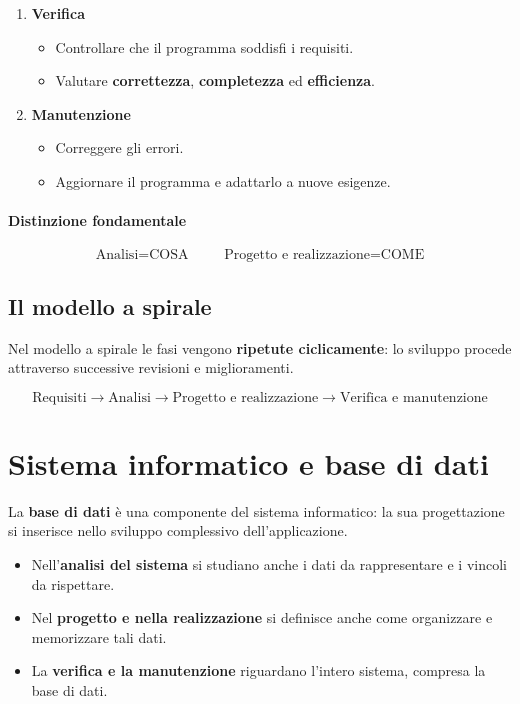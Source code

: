 \begin{enumerate}
    \item \textbf{Verifica}
    \begin{itemize}
        \item Controllare che il programma soddisfi i requisiti.
        \item Valutare \textbf{correttezza}, \textbf{completezza}
        ed \textbf{efficienza}.
    \end{itemize}

    \item \textbf{Manutenzione}
    \begin{itemize}
        \item Correggere gli errori.
        \item Aggiornare il programma e adattarlo a nuove esigenze.
    \end{itemize}
\end{enumerate}

\paragraph{Distinzione fondamentale}
\[
\boxed{\text{Analisi} = \text{COSA}}
\qquad
\boxed{\text{Progetto e realizzazione} = \text{COME}}
\]

\subsection{Il modello a spirale}

Nel modello a spirale le fasi vengono \textbf{ripetute ciclicamente}:
lo sviluppo procede attraverso successive revisioni e miglioramenti.

\[
\text{Requisiti}
\longrightarrow
\text{Analisi}
\longrightarrow
\text{Progetto e realizzazione}
\longrightarrow
\text{Verifica e manutenzione}
\]

\section{Sistema informatico e base di dati}

La \textbf{base di dati} è una componente del sistema informatico:
la sua progettazione si inserisce nello sviluppo complessivo
dell'applicazione.

\begin{itemize}
    \item Nell'\textbf{analisi del sistema} si studiano anche
    i dati da rappresentare e i vincoli da rispettare.
    \item Nel \textbf{progetto e nella realizzazione} si definisce
    anche come organizzare e memorizzare tali dati.
    \item La \textbf{verifica e la manutenzione} riguardano
    l'intero sistema, compresa la base di dati.
\end{itemize}

